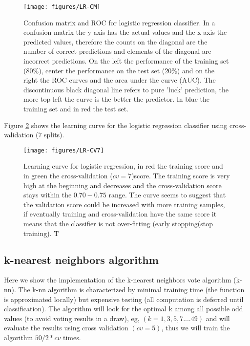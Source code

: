 \documentclass[11pt]{article}
\theoremstyle{definition}
\theoremstyle{remark}
\begin{document}
{\begin{figure}[H]
        \centering
        \texttt{[image: figures/LR-CM]}
        \caption{Confusion matrix and ROC for logistic regression classifier. In a confusion matrix the y-axis has the actual values and the x-axis the predicted values, therefore the counts on the diagonal are the number of correct predictions and elements of the diagonal are incorrect predictions.
        On the left the performance of the training set ($80\%$), center the performance on the test set ($20\%$) and on the right the ROC curves and the area under the curve (AUC). The discontinuous black diagonal line refers to pure 'luck' prediction, the more top left the curve is the better the predictor. In blue the training set and in red the test set.}
\label{fig:lr-cm}
\end{figure}

Figure \ref{fig:lr-cv7} shows the learning curve for the logistic regression classifier using cross-validation (7 splits).
\begin{figure}[H]
        \centering
        \texttt{[image: figures/LR-CV7]}
        \caption{Learning curve for logistic regression, in red the training score and in green the cross-validation ($cv=7$)score. The training score is very high at the beginning and decreases and the cross-validation score stays within the $0.70-0.75$ range. The curve seems to suggest that the validation score could be increased with more training samples, if eventually training and cross-validation have the same score it means that the classifier is not over-fitting (early stopping(stop training). T
        } \label{fig:lr-cv7}
\end{figure}


\subsection{k-nearest neighbors algorithm}
\label{se:reskneighbors}
Here we show the implementation of the k-nearest neighbors vote algorithm (k-nn). The k-nn algorithm is characterized by minimal training time (the function is approximated locally) but expensive testing (all computation is deferred until classification).
The algorithm will look for the optimal k among all possible odd values (to avoid voting results in a draw), eg, $(k=1,3,5,7....49)$ and will evaluate the results using cross validation $(cv=5)$, thus we will train the algorithm $50/2*cv$ times. 

}
\end{document}
